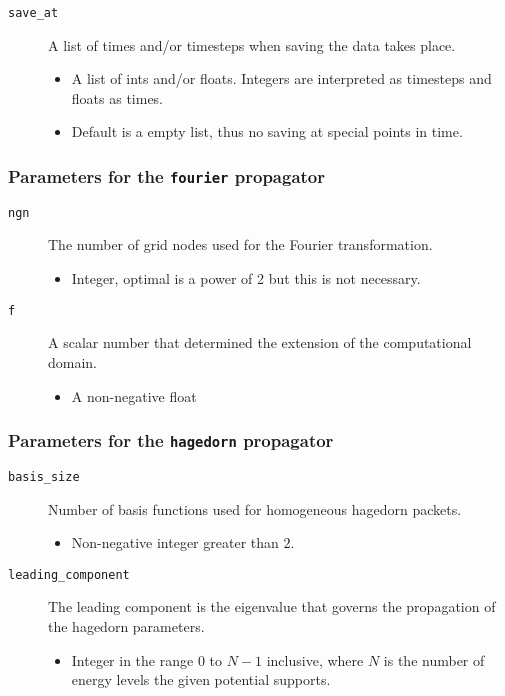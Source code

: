 \documentclass[a4paper,10pt]{report}
\begin{document}
\begin{description}
  \item[\texttt{save\_at}] A list of times and/or timesteps when saving the data takes place.
  \begin{itemize}
    \item A list of ints and/or floats. Integers are interpreted as timesteps and floats as times.
    \item Default is a empty list, thus no saving at special points in time.
  \end{itemize}
\end{description}

\subsubsection{Parameters for the \texttt{fourier} propagator}

\begin{description}
  \item[\texttt{ngn}] The number of grid nodes used for the Fourier transformation.
  \begin{itemize}
    \item Integer, optimal is a power of 2 but this is not necessary.
  \end{itemize}

  \item[\texttt{f}] A scalar number that determined the extension of the computational domain.
  \begin{itemize}
    \item A non-negative float
  \end{itemize}
\end{description}

\subsubsection{Parameters for the \texttt{hagedorn} propagator}

\begin{description}
  \item[\texttt{basis\_size}] Number of basis functions used for homogeneous hagedorn packets.
  \begin{itemize}
    \item Non-negative integer greater than $2$.
  \end{itemize}

  \item[\texttt{leading\_component}] The leading component is the eigenvalue that
                                    governs the propagation of the hagedorn parameters.
  \begin{itemize}
    \item Integer in the range $0$ to $N-1$ inclusive, where $N$ is the number of
          energy levels the given potential supports.
  \end{itemize}
\end{description}
\end{document}
